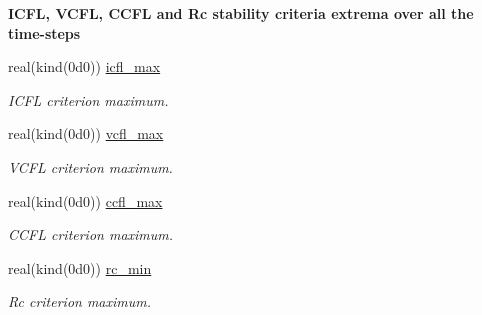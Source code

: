 \begin{Indent}\textbf{ I\+C\+FL, V\+C\+FL, C\+C\+FL and Rc stability criteria extrema over all the time-\/steps}\par
\begin{DoxyCompactItemize}
\item 
real(kind(0d0)) \hyperlink{namespacem__data__output_a08a5f85ca151336658398a0eccc93cb4}{icfl\+\_\+max}
\begin{DoxyCompactList}\small\item\em I\+C\+FL criterion maximum. \end{DoxyCompactList}\item 
real(kind(0d0)) \hyperlink{namespacem__data__output_ada9b22b5a158b2ce980f43cec00a1ac6}{vcfl\+\_\+max}
\begin{DoxyCompactList}\small\item\em V\+C\+FL criterion maximum. \end{DoxyCompactList}\item 
real(kind(0d0)) \hyperlink{namespacem__data__output_afc429263f629a2ba4b5655dec5fd2509}{ccfl\+\_\+max}
\begin{DoxyCompactList}\small\item\em C\+C\+FL criterion maximum. \end{DoxyCompactList}\item 
real(kind(0d0)) \hyperlink{namespacem__data__output_adb7a215382fddf4e405b97cd2f1ddf0d}{rc\+\_\+min}
\begin{DoxyCompactList}\small\item\em Rc criterion maximum. \end{DoxyCompactList}\end{DoxyCompactItemize}
\end{Indent}
\textbf{ }\par
